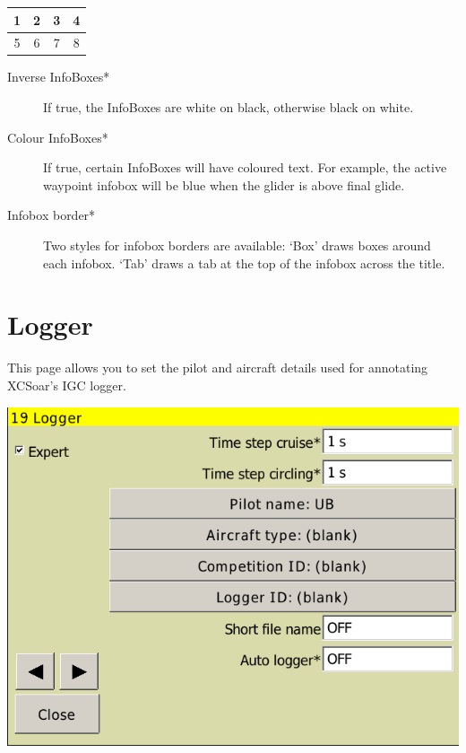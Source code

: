 \documentclass[a4paper,12pt]{refrep}
\begin{document}
\begin{tabular}{|c|c|c|c|}
\hline
1 & 2 & 3 & 4 \\
\hline
\hline
5 & 6 & 7 & 8 \\
\hline
\end{tabular}

\begin{description}
\item[Inverse InfoBoxes*]  If true, the InfoBoxes are white on black, otherwise black on white.
\item[Colour InfoBoxes*]  If true, certain InfoBoxes will have coloured text. For example, the 
active waypoint infobox will be blue when the glider is above final glide.
\item[Infobox border*]  Two styles for infobox borders are available: `Box'
draws boxes around each infobox.  `Tab' draws a tab at the top of the infobox across the title.
\end{description}


\clearpage
\section{Logger}

This page allows you to set the pilot and aircraft details used for
annotating XCSoar's IGC logger. 

\begin{center}
\includegraphics[angle=0,width=\linewidth,keepaspectratio='true']{figures/config-logger.png}
\end{center}
\end{document}

